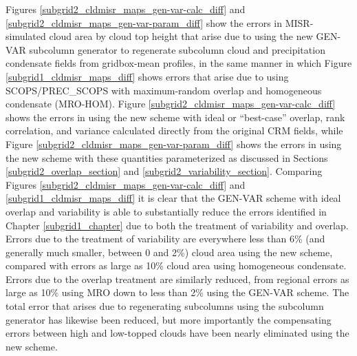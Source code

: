 Figures \ref{subgrid2_cldmisr_maps_gen-var-calc_diff} and \ref{subgrid2_cldmisr_maps_gen-var-param_diff} show the errors in MISR-simulated cloud area by cloud top height that arise due to using the new GEN-VAR subcolumn generator to regenerate subcolumn cloud and precipitation condensate fields from gridbox-mean profiles, in the same manner in which Figure \ref{subgrid1_cldmisr_maps_diff} shows errors that arise due to using SCOPS/PREC\_SCOPS with maximum-random overlap and homogeneous condensate (MRO-HOM). Figure \ref{subgrid2_cldmisr_maps_gen-var-calc_diff} shows the errors in using the new scheme with ideal or ``best-case'' overlap, rank correlation, and variance calculated directly from the original CRM fields, while Figure \ref{subgrid2_cldmisr_maps_gen-var-param_diff} shows the errors in using the new scheme with these quantities parameterized as discussed in Sections \ref{subgrid2_overlap_section} and \ref{subgrid2_variability_section}. Comparing Figures \ref{subgrid2_cldmisr_maps_gen-var-calc_diff} and \ref{subgrid1_cldmisr_maps_diff} it is clear that the GEN-VAR scheme with ideal overlap and variability is able to substantially reduce the errors identified in Chapter \ref{subgrid1_chapter} due to both the treatment of variability and overlap. Errors due to the treatment of variability are everywhere less than 6\% (and generally much smaller, between 0 and 2\%) cloud area using the new scheme, compared with errors as large as 10\% cloud area using homogeneous condensate. Errors due to the overlap treatment are similarly reduced, from regional errors as large as 10\% using MRO down to less than 2\% using the GEN-VAR scheme. The total error that arises due to regenerating subcolumns using the subcolumn generator has likewise been reduced, but more importantly the compensating errors between high and low-topped clouds have been nearly eliminated using the new scheme.


